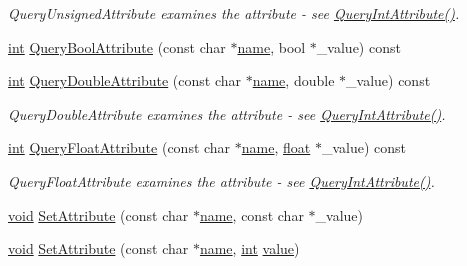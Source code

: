 \begin{DoxyCompactItemize}
\begin{DoxyCompactList}\small\item\em Query\-Unsigned\-Attribute examines the attribute -\/ see \hyperlink{class_ti_xml_element_aea0bfe471380f281c5945770ddbf52b9}{Query\-Int\-Attribute()}. \end{DoxyCompactList}\item 
\hyperlink{wglew_8h_a500a82aecba06f4550f6849b8099ca21}{int} \hyperlink{class_ti_xml_element_af4a1d3f88c28eb0f3115dc39ebd83fff}{Query\-Bool\-Attribute} (const char $\ast$\hyperlink{fmod__codec_8h_a5c4947d4516dd7cfa3505ce3a648a4ef}{name}, bool $\ast$\-\_\-value) const 
\item 
\hyperlink{wglew_8h_a500a82aecba06f4550f6849b8099ca21}{int} \hyperlink{class_ti_xml_element_a898d7730ecc341f0bffc7a9dadbf1ce7}{Query\-Double\-Attribute} (const char $\ast$\hyperlink{fmod__codec_8h_a5c4947d4516dd7cfa3505ce3a648a4ef}{name}, double $\ast$\-\_\-value) const 
\begin{DoxyCompactList}\small\item\em Query\-Double\-Attribute examines the attribute -\/ see \hyperlink{class_ti_xml_element_aea0bfe471380f281c5945770ddbf52b9}{Query\-Int\-Attribute()}. \end{DoxyCompactList}\item 
\hyperlink{wglew_8h_a500a82aecba06f4550f6849b8099ca21}{int} \hyperlink{class_ti_xml_element_aa04d3af11601ef5a5f88295203a843be}{Query\-Float\-Attribute} (const char $\ast$\hyperlink{fmod__codec_8h_a5c4947d4516dd7cfa3505ce3a648a4ef}{name}, \hyperlink{fmod_8h_aeb841aa4b4b5f444b5d739d865b420af}{float} $\ast$\-\_\-value) const 
\begin{DoxyCompactList}\small\item\em Query\-Float\-Attribute examines the attribute -\/ see \hyperlink{class_ti_xml_element_aea0bfe471380f281c5945770ddbf52b9}{Query\-Int\-Attribute()}. \end{DoxyCompactList}\item 
\hyperlink{wglew_8h_aeea6e3dfae3acf232096f57d2d57f084}{void} \hyperlink{class_ti_xml_element_abf0b3bd7f0e4c746a89ec6e7f101fc32}{Set\-Attribute} (const char $\ast$\hyperlink{fmod__codec_8h_a5c4947d4516dd7cfa3505ce3a648a4ef}{name}, const char $\ast$\-\_\-value)
\item 
\hyperlink{wglew_8h_aeea6e3dfae3acf232096f57d2d57f084}{void} \hyperlink{class_ti_xml_element_ace6f4be75e373726d4774073d666d1a7}{Set\-Attribute} (const char $\ast$\hyperlink{fmod__codec_8h_a5c4947d4516dd7cfa3505ce3a648a4ef}{name}, \hyperlink{wglew_8h_a500a82aecba06f4550f6849b8099ca21}{int} \hyperlink{fmod__dsp_8h_a6a4f8a1a444e9080b297963b3db29fe0}{value})

\end{DoxyCompactItemize}
